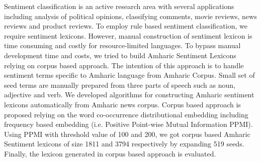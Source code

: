 Sentiment classification is an active research area with several applications including analysis of political opinions, classifying comments, movie reviews, news reviews and product reviews. To employ rule based sentiment classification, we require sentiment lexicons. However, manual construction of sentiment lexicon is time consuming and costly for resource-limited languages. To bypass manual development time and costs, we tried to build Amharic Sentiment Lexicons relying on corpus based approach. The intention of this approach is to handle sentiment terms specific to Amharic language from Amharic Corpus. Small set of seed terms are manually prepared from three parts of speech such as noun, adjective and verb. We developed algorithms for constructing Amharic sentiment lexicons automatically from Amharic news corpus. Corpus based approach is proposed relying on the word co-occurrence distributional embedding including frequency based embedding (i.e. Positive Point-wise Mutual Information PPMI). Using PPMI with threshold value of 100 and 200, we got corpus based Amharic Sentiment lexicons of size 1811 and 3794 respectively by expanding 519 seeds. Finally, the lexicon generated in corpus based approach is evaluated.
